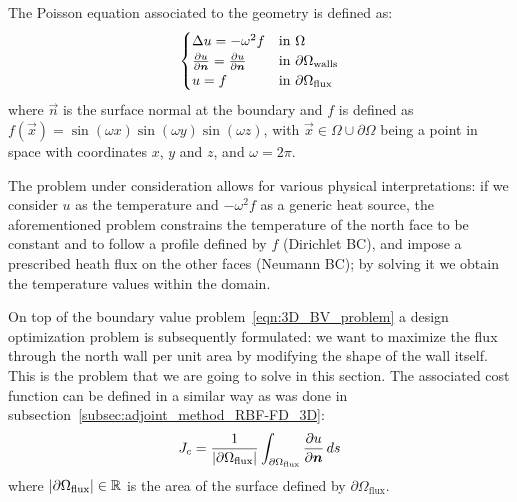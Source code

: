 The Poisson equation associated to the geometry is defined as:
\begin{equation}
	\label{eqn:3D_BV_problem}
	\begin{cases}
		\Delta u = - \omega^2 f  &  \text{in $\Omega$}  \\
		\frac{\partial u}{\partial \vec{n}} = \frac{\partial u}{\partial \vec{n}}  &  \text{in $\partial\Omega_\textup{walls}$}  \\
		u = f  &  \text{in $\partial\Omega_\textup{flux}$}  \\
	\end{cases}
\end{equation}
where $\vec{n}$ is the surface normal at the boundary and $f$ is defined as $f(\vec{x}) = \sin(\omega x)\sin(\omega y)\sin(\omega z)$, with $\vec{x} \in \Omega\cup\partial\Omega$ being a point in space with coordinates $x$, $y$ and $z$, and $\omega = 2\pi$. 

The problem under consideration allows for various physical interpretations: if we consider $u$ as the temperature and $-\omega^2 f$ as a generic heat source, the aforementioned problem constrains the temperature of the north face to be constant and to follow a profile defined by $f$ (Dirichlet BC), and impose a prescribed heath flux on the other faces (Neumann BC); by solving it we obtain the temperature values within the domain.

On top of the boundary value problem~\eqref{eqn:3D_BV_problem} a design optimization problem is subsequently formulated: we want to maximize the flux through the north wall per unit area by modifying the shape of the wall itself. This is the problem that we are going to solve in this section. The associated cost function can be defined in a similar way as was done in subsection~\vref{subsec:adjoint_method_RBF-FD_3D}:
\begin{equation}
	\label{eqn:continuous_3D_cost_function_results}
	J_c = \frac{1}{\abs{\partial\Omega_\text{flux}}} \int_{\partial\Omega_\textup{flux}} \frac{\partial u}{\partial \vec{n}} \, ds
\end{equation}
where $\lvert\partial\Omega_\text{flux}\rvert \in \mathbb{R}$ is the area of the surface defined by $\partial\Omega_\text{flux}$.


